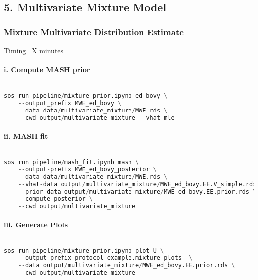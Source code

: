 \documentclass[12pt]{article}
\begin{document}
\subsection*{5. Multivariate Mixture Model}


\subsubsection*{Mixture Multivariate Distribution Estimate}
Timing ~X minutes

\paragraph*{i. Compute MASH prior}


\noindent
\begin{lstlisting}[language=Python]

sos run pipeline/mixture_prior.ipynb ed_bovy \
    --output_prefix MWE_ed_bovy \
    --data data/multivariate_mixture/MWE.rds \
    --cwd output/multivariate_mixture --vhat mle

\end{lstlisting}




\paragraph*{ii. MASH fit}


\noindent
\begin{lstlisting}[language=Python]

sos run pipeline/mash_fit.ipynb mash \
    --output-prefix MWE_ed_bovy_posterior \
    --data data/multivariate_mixture/MWE.rds \
    --vhat-data output/multivariate_mixture/MWE_ed_bovy.EE.V_simple.rds \
    --prior-data output/multivariate_mixture/MWE_ed_bovy.EE.prior.rds \
    --compute-posterior \
    --cwd output/multivariate_mixture

\end{lstlisting}




\paragraph*{iii. Generate Plots}


\noindent
\begin{lstlisting}[language=Python]

sos run pipeline/mixture_prior.ipynb plot_U \
    --output-prefix protocol_example.mixture_plots  \
    --data output/multivariate_mixture/MWE_ed_bovy.EE.prior.rds \
    --cwd output/multivariate_mixture

\end{lstlisting}
\end{document}
